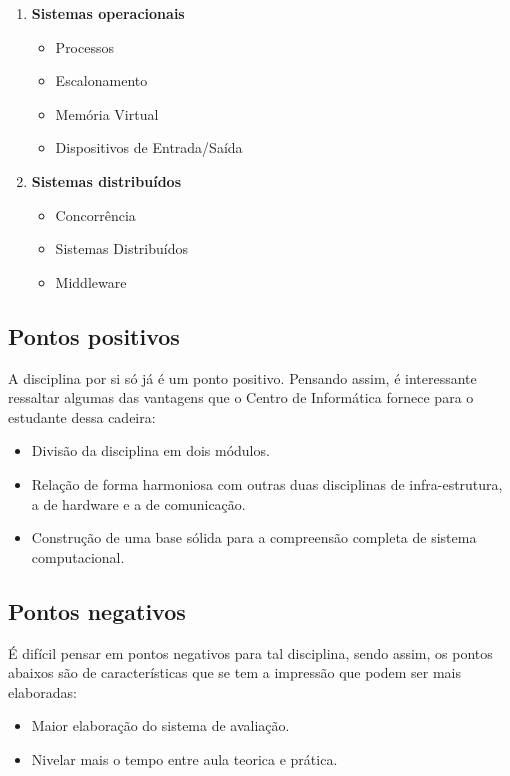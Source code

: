 \documentclass[a4paper]{article}
\begin{document}
\begin{enumerate}
\item \textbf{Sistemas operacionais}  
	\begin{itemize}
	\item Processos
	\item Escalonamento
	\item Memória Virtual
	\item Dispositivos de Entrada/Saída
	\end{itemize}
\item \textbf{Sistemas distribuídos} 
	\begin{itemize}
	\item Concorrência
    \item Sistemas Distribuídos
    \item Middleware
	\end{itemize}
\end{enumerate}

\subsection{Pontos positivos}

\cite{CInWiki}A disciplina por si só já é um ponto positivo. Pensando assim, é interessante ressaltar algumas das vantagens que o Centro de Informática fornece para o estudante dessa cadeira:

\begin{itemize}
\item Divisão da disciplina em dois módulos.
\item Relação de forma harmoniosa com outras duas disciplinas de infra-estrutura, a de hardware e a de comunicação.
\item Construção de uma base sólida para a compreensão completa de sistema computacional.
 
\end{itemize}

\subsection{Pontos negativos}

É difícil pensar em pontos negativos para tal disciplina, sendo assim, os pontos abaixos são de características que se tem a impressão que podem ser mais elaboradas:

\begin{itemize}

\item Maior elaboração do sistema de avaliação.
\item Nivelar mais o tempo entre aula teorica e prática.
 
\end{itemize}
\end{document}

